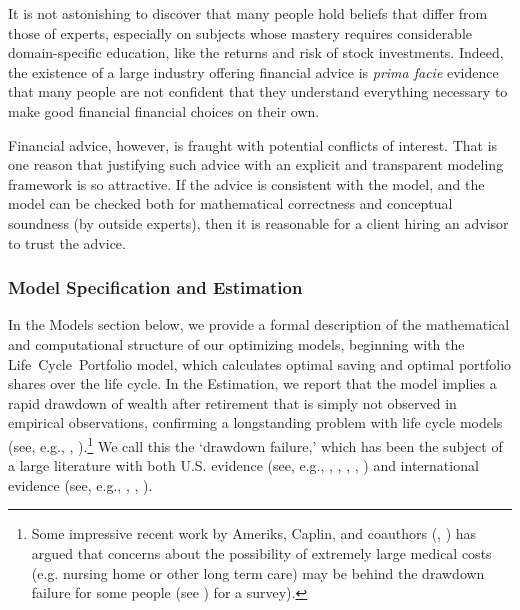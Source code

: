 \documentclass{article}
\begin{document}
It is not astonishing to discover that many people hold beliefs that differ from those of experts, especially on subjects whose mastery requires considerable domain-specific education, like the returns and risk of stock investments.
Indeed, the existence of a large industry offering financial advice is \textit{prima facie} evidence that many people are not confident that they understand everything necessary to make good financial financial choices on their own.

Financial advice, however, is fraught with potential conflicts of interest.
That is one reason that justifying such advice with an explicit and transparent modeling framework is so attractive.
If the advice is consistent with the model, and the model can be checked both for mathematical correctness and conceptual soundness (by outside experts), then it is reasonable for a client hiring an advisor to trust the advice.

\subsubsection{Model Specification and Estimation}

In the Models section below, we provide a formal description of the mathematical and computational structure of our optimizing models, beginning with the Life~Cycle~Portfolio model, which calculates optimal saving and optimal portfolio shares over the life cycle.
In the Estimation, we report that the model implies a rapid drawdown of wealth after retirement that is simply not observed in empirical observations, confirming a longstanding problem with life cycle models (see, e.g., \cite{hurd1987savings}, \cite{HEIMER_2019}).\footnote{Some impressive recent work by Ameriks, Caplin, and coauthors (\cite{ameriks2011joy}, \cite{Ameriks2020jpe}) has argued that concerns about the possibility of extremely large medical costs (e.g. nursing home or other long term care) may be behind the drawdown failure for some people (see \cite{DeNardi2016d}) for a survey).}
We call this the `drawdown failure,' which has been the subject of a large literature with both U.S. evidence (see, e.g., \cite{Hurd_1989}, \cite{DeNardi2016d}, \cite{Kopecky_2014}, \cite{Mortenson_2019}, \cite{Poterba_2018}) and international evidence (see, e.g., \cite{Christensen_2022}, \cite{Ventura_2020}, \cite{Niimi_2019}).

\end{document}
